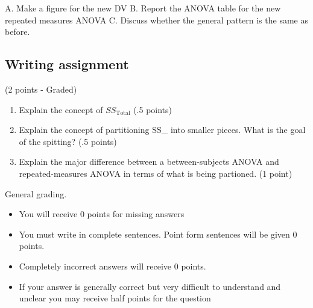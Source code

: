 \documentclass[]{book}
\newenvironment{Shaded}{\begin{snugshade}}{\end{snugshade}}
\newcommand{\KeywordTok}[1]{\textcolor[rgb]{0.13,0.29,0.53}{\textbf{#1}}}
\newcommand{\DataTypeTok}[1]{\textcolor[rgb]{0.13,0.29,0.53}{#1}}
\newcommand{\DecValTok}[1]{\textcolor[rgb]{0.00,0.00,0.81}{#1}}
\newcommand{\StringTok}[1]{\textcolor[rgb]{0.31,0.60,0.02}{#1}}
\newcommand{\OperatorTok}[1]{\textcolor[rgb]{0.81,0.36,0.00}{\textbf{#1}}}
\newcommand{\NormalTok}[1]{#1}
\providecommand{\tightlist}{%
  \setlength{\itemsep}{0pt}\setlength{\parskip}{0pt}}
\begin{document}
\begin{Shaded}
\end{Shaded}

A. Make a figure for the new DV B. Report the ANOVA table for the new
repeated measures ANOVA C. Discuss whether the general pattern is the
same as before.

\subsection{Writing assignment}\label{writing-assignment-8}

(2 points - Graded)

\begin{enumerate}
\def\labelenumi{\arabic{enumi}.}
\item
  Explain the concept of \(SS_\text{Total}\) (.5 points)
\item
  Explain the concept of partitioning SS\_ into smaller
  pieces. What is the goal of the spitting? (.5 points)
\item
  Explain the major difference between a between-subjects ANOVA and
  repeated-measures ANOVA in terms of what is being partioned. (1 point)
\end{enumerate}

General grading.

\begin{itemize}
\tightlist
\item
  You will receive 0 points for missing answers
\item
  You must write in complete sentences. Point form sentences will be
  given 0 points.
\item
  Completely incorrect answers will receive 0 points.
\item
  If your answer is generally correct but very difficult to understand
  and unclear you may receive half points for the question
\end{itemize}
\end{document}
